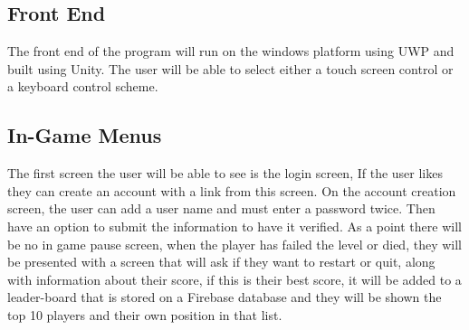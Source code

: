 \documentclass{article}
\begin{document}
\subsection{Front End}
The front end of the program will run on the windows platform using UWP and built using Unity. The user will be able to select either a touch screen control or a keyboard control scheme.


\subsection{In-Game Menus}
The first screen the user will be able to see is the login screen, If the user likes they can create an account with a link from this screen.
On the account creation screen, the user can add a user name and must enter a password twice. Then have an option to submit the information to have it verified. As a point there will be no in game pause screen, when the player has failed the level or died, they will be presented with a screen that will ask if they want to restart or quit, along with information about their score, if this is their best score, it will be added to a leader-board that is stored on a Firebase database and they will be shown the top 10 players and their own position in that list.
\end{document}
